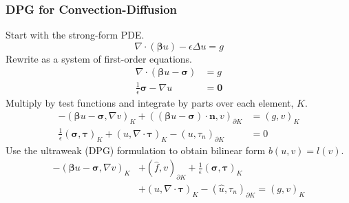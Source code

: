 \documentclass[mathserif]{beamer}
\def\btau{\boldsymbol\tau}
\def\bsigma{\boldsymbol\sigma}
\def\bbeta{\boldsymbol\beta}
\begin{document}
\begin{frame}
\frametitle{DPG for Convection-Diffusion}
Start with the strong-form PDE.
\[
\nabla\cdot(\bbeta u)-\epsilon\Delta u = g
\]
Rewrite as a system of first-order equations.
\begin{align*}
\nabla\cdot(\bbeta u-\bsigma)&=g\\
\frac{1}{\epsilon}\bsigma-\nabla u&=\boldsymbol0
\end{align*}
Multiply by test functions and integrate by parts over each element, $K$.
\begin{align*}
-(\bbeta u-\bsigma,\nabla v)_K+((\bbeta
u-\bsigma)\cdot\mathbf{n},v)_{\partial K}&=(g,v)_K\\
\frac{1}{\epsilon}(\bsigma,\btau)_K+(u,\nabla\cdot\btau)_K
-(u,\tau_n)_{\partial K}&=0
\end{align*}
Use the ultraweak (DPG) formulation to obtain bilinear form $b(u,v)=l(v)$.
\begin{align*}
-(\bbeta u-\bsigma,\nabla v)_K&+(\hat f,v)_{\partial K}
+ \frac{1}{\epsilon}(\bsigma,\btau)_K\\
&+(u,\nabla\cdot\btau)_K
-(\hat u,\tau_n)_{\partial K}=(g,v)_K
\end{align*}
\end{frame}
\begin{comment}
With that ultra-brief refresher, we can now apply DPG to the
convection-diffusion equation. We prefer to work with systems of first order
equations. Then, multiplying the top equation by a scalar valued test
function, v, and the second by a vector valued test function tau, we can
integrate by parts over each element, K. Combining the two equations, we get
our bilinear form for convection diffusion. We seek the field variable, u and
sigma in L2, but that leaves their traces undefined. So, in a manner similar
to the hybridized DG method, we define new unknowns for our traces and fluxes,
u hat and f hat.
\end{comment}
\end{document}
